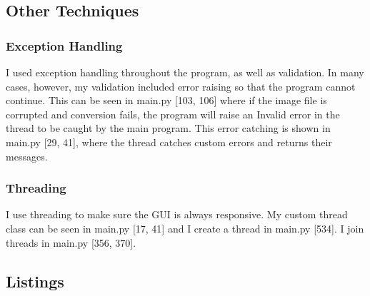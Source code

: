 \documentclass[titlepage]{article}
\begin{document}
\subsection{Other Techniques}
\subsubsection{Exception Handling}
I used exception handling throughout the program, as well as validation. In many cases, however, my validation included error raising so that the program cannot continue. This can be seen in main.py [103, 106] where if the image file is corrupted and conversion fails, the program will raise an Invalid error in the thread to be caught by the main program. This error catching is shown in main.py [29, 41], where the thread catches custom errors and returns their messages.
\subsubsection{Threading}
I use threading to make sure the GUI is always responsive. My custom thread class can be seen in main.py [17, 41] and I create a thread in main.py [534]. I join threads in main.py [356, 370].

\subsection{Listings}
\end{document}
